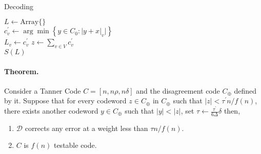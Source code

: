 \documentclass{article}
\begin{document}
\begin{multicols*}{2}
  \paragraph{}
  \begin{algorithm}[H]
    \caption{Decoding}
    \label{alg:three}
    $ L \leftarrow \text{Array} \{ \} $\\
     {
      $c^{\prime}_{v} \leftarrow \arg\min {\left\{  y \in C_{0} : |y + x|_{v} |  \right\} } $\\
      $ L_{v} \leftarrow c^{\prime}_{v}$
    }
    $ z \leftarrow \sum_{v \in V}{c^{\prime}_{v}} $\\
    \Return  $S(L) $

  \end{algorithm}

  \paragraph{Theorem.} Consider a Tanner Code $C = [n, n\rho, n\delta]$ and the disagreement code $C_{\oplus}$ defined by it. Suppose that for every codeword $ z \in C_{\oplus}$ in $C_{\oplus}$ such that $|z| < \tau^{\prime} n / f\left(n\right)$, there exists another codeword $y \in C_{\oplus} $ such that $|y| < |z|$, set $\tau \leftarrow \frac{\tau^{\prime} }{6 \Delta} \delta$ then, 

  \begin{enumerate}
    \item $\mathcal{D}$ corrects any error at a weight less than $\tau n / f\left(n\right)$.   
    \item $C$ is $f\left( n \right)$ testable code.
  \end{enumerate}



\end{multicols*}
\end{document}
